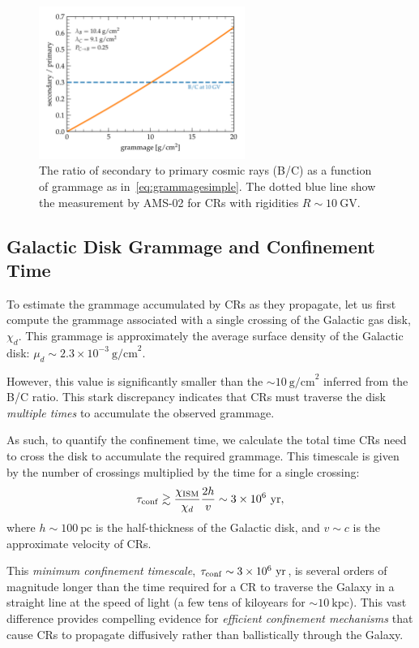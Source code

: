\begin{figure}[t]
\centering
\includegraphics[width=0.6\textwidth]{figures/grammage_simple.pdf} 
\caption{The ratio of secondary to primary cosmic rays (B/C) as a function of grammage as in~\cref{eq:grammagesimple}. The dotted blue line show the measurement by AMS-02 for CRs with rigidities \(R \sim 10~\text{GV}\).}
\label{fig:grammage10}
\end{figure}

\subsection{Galactic Disk Grammage and Confinement Time}

To estimate the grammage accumulated by CRs as they propagate, let us first compute the grammage associated with a single crossing of the Galactic gas disk, \(\chi_d\). This grammage is approximately the average surface density of the Galactic disk: \(\mu_d \sim 2.3 \times 10^{-3}~\text{g/cm}^2\).  

However, this value is significantly smaller than the \(\sim 10~\text{g/cm}^2\) inferred from the B/C ratio. This stark discrepancy indicates that CRs must traverse the disk \emph{multiple times} to accumulate the observed grammage.  

As such, to quantify the confinement time, we calculate the total time CRs need to cross the disk to accumulate the required grammage. This timescale is given by the number of crossings multiplied by the time for a single crossing:  
\[
\tau_{\rm conf} \gtrsim \frac{\chi_{\rm ISM}}{\chi_d} \frac{2h}{v} \sim 3 \times 10^6~\text{yr},
\]
where \(h \sim 100~\text{pc}\) is the half-thickness of the Galactic disk, and \(v \sim c\) is the approximate velocity of CRs.  

This \emph{minimum confinement timescale}, \(\tau_{\rm conf} \sim 3 \times 10^6~\text{yr}\), is several orders of magnitude longer than the time required for a CR to traverse the Galaxy in a straight line at the speed of light (a few tens of kiloyears for \(\sim 10~\text{kpc}\)). This vast difference provides compelling evidence for \emph{efficient confinement mechanisms} that cause CRs to propagate diffusively rather than ballistically through the Galaxy.  

